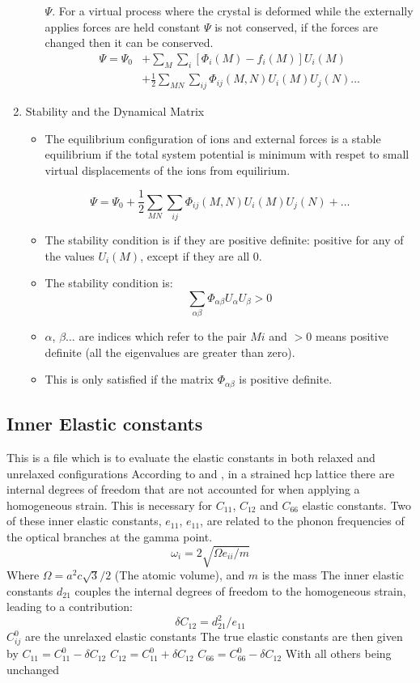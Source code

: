 \documentclass[11pt]{article}
\begin{document}
\begin{enumerate}
\begin{itemize}
\(\Psi\). For a virtual process where the crystal is deformed while the
externally applies forces are held constant \(\Psi\) is not conserved, if
the forces are changed then it can be conserved. 
\begin{align}
\Psi = \Psi_{0} &+ \sum_{M}\sum_{i}[\Phi_{i}(M) - f_i(M)]U_{i}(M)\\
     &+ \frac{1}{2}\sum_{MN}\sum_{ij}\Phi_{ij}(M,N)U_i(M)U_j(N) \dots
\end{align}
\end{itemize}
\item Stability and the Dynamical Matrix
\label{sec:org6cd2e86}
\begin{itemize}
\item The equilibrium configuration of ions and external forces is a stable
equilibrium if the total system potential is minimum with respet to
small virtual displacements of the ions from equilirium.
\end{itemize}
\[\Psi = \Psi_{0}+
     \frac{1}{2}\sum_{MN}\sum_{ij}\Phi_{ij}(M,N)U_i(M)U_j(N) + \dots \]
\begin{itemize}
\item The stability condition is if they are positive definite: positive for
any of the values \(U_{i}(M)\), except if they are all 0.
\item The stability condition is:
\[ \sum_{\alpha \beta} \Phi_{\alpha\beta}U_{\alpha}U_{\beta} > 0 \]
\item \(\alpha\), \(\beta \dots\) are indices which refer to the pair  \(Mi\) and
\(>0\) means positive definite (all the eigenvalues are greater than zero).
\item This is only satisfied if the matrix \(\Phi_{\alpha\beta}\) is positive definite.
\end{itemize}
\end{enumerate}

\subsection{Inner Elastic constants}
\label{sec:orgef9de5b}
This is a file which is to evaluate the elastic constants in both relaxed and unrelaxed configurations
According to \cite{Clouet2012} and \cite{Cousins1979}, in a strained hcp lattice there are internal degrees of freedom
that are not accounted for when applying a homogeneous strain.
This is necessary for \(C_{11}\), \(C_{12}\) and \(C_{66}\) elastic constants.
Two of these inner elastic constants, \(e_{11}\), \(e_{11}\), are related to the phonon frequencies of the optical branches at the gamma point.
\[\omega_i = 2  \sqrt{ \Omega  e_{ii} / m }\]
Where \(\Omega = a^2  c  \sqrt{3} / 2\) (The atomic volume), and \(m\) is the mass
The inner elastic constants \(d_{21}\) couples the internal degrees of freedom to the homogeneous strain, leading to a contribution:
\[\delta C_{12} = d_{21}^2 / e_{11}\]
\(C^0_{ij}\) are the unrelaxed elastic constants
The true elastic constants are then given by 
\(C_{11} = C^0_{11} - \delta C_{12}\) 
\(C_{12} = C^0_{11} + \delta C_{12}\) 
\(C_{66} = C^0_{66} - \delta C_{12}\) 
With all others being unchanged 
\end{document}
